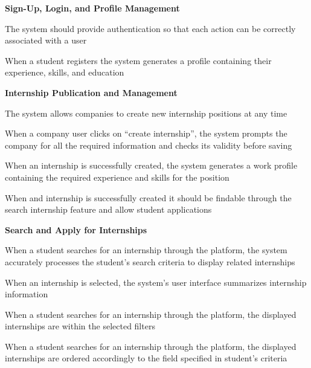 \begin{enumerate}[label={[R\arabic*]}]
\item[] \textbf{Sign-Up, Login, and Profile Management}


\item The system should provide authentication so that each action can be correctly associated with a user


\item When a student registers the system generates a profile containing their experience, skills, and education


\item[] \textbf{Internship Publication and Management}


\item The system allows companies to create new internship positions at any time


\item When a company user clicks on “create internship”, the system prompts the company for all the required information and checks its validity before saving


\item When an internship is successfully created, the system generates a work profile containing the required experience and skills for the position

 
\item When and internship is successfully created it should be findable through the search internship feature and allow student applications

\item[] \textbf{Search and Apply for Internships}


\item When a student searches for an internship through the platform, the system accurately processes the student’s search criteria to display related internships


\item When an internship is selected, the system’s user interface summarizes internship information


\item When a student searches for an internship through the platform, the displayed internships  are within the selected filters


\item When a student searches for an internship through the platform, the displayed internships are ordered accordingly to the field specified in student’s criteria


\end{enumerate}
